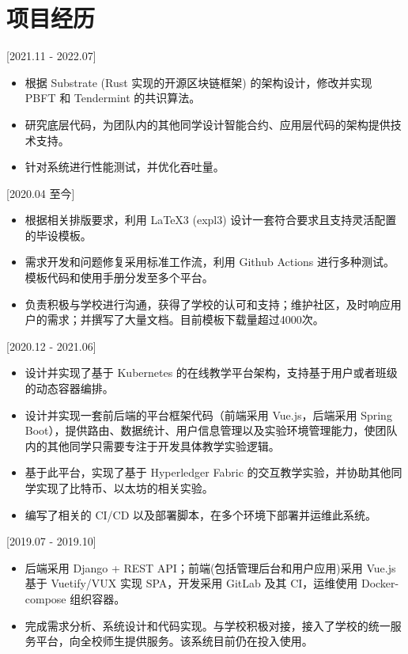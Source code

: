 \documentclass{resume}
\begin{document}
\section{项目经历}

[2021.11 - 2022.07] 
\begin{itemize}
  \item 根据 Substrate (Rust 实现的开源区块链框架) 的架构设计，修改并实现 PBFT 和 Tendermint 的共识算法。
  \item 研究底层代码，为团队内的其他同学设计智能合约、应用层代码的架构提供技术支持。
  \item 针对系统进行性能测试，并优化吞吐量。 
\end{itemize}

[2020.04 至今]
\begin{itemize}
  \item 根据相关排版要求，利用 LaTeX3 (expl3) 设计一套符合要求且支持灵活配置的毕设模板。
  \item 需求开发和问题修复采用标准工作流，利用 Github Actions 进行多种测试。模板代码和使用手册分发至多个平台。
  \item 负责积极与学校进行沟通，获得了学校的认可和支持；维护社区，及时响应用户的需求；并撰写了大量文档。目前模板下载量超过4000次。
\end{itemize}


[2020.12 - 2021.06] 

\begin{itemize}
  \item 设计并实现了基于 Kubernetes 的在线教学平台架构，支持基于用户或者班级的动态容器编排。
  \item 设计并实现一套前后端的平台框架代码（前端采用 Vue.js，后端采用 Spring Boot），提供路由、数据统计、用户信息管理以及实验环境管理能力，使团队内的其他同学只需要专注于开发具体教学实验逻辑。
  \item 基于此平台，实现了基于 Hyperledger Fabric 的交互教学实验，并协助其他同学实现了比特币、以太坊的相关实验。
  \item 编写了相关的 CI/CD 以及部署脚本，在多个环境下部署并运维此系统。
\end{itemize}

[2019.07 - 2019.10] 

\begin{itemize}
  \item 后端采用 Django + REST API；前端(包括管理后台和用户应用)采用 Vue.js 基于 Vuetify/VUX 实现 SPA，开发采用 GitLab 及其 CI，运维使用 Docker-compose 组织容器。
  \item 完成需求分析、系统设计和代码实现。与学校积极对接，接入了学校的统一服务平台，向全校师生提供服务。该系统目前仍在投入使用。
\end{itemize}
\end{document}
